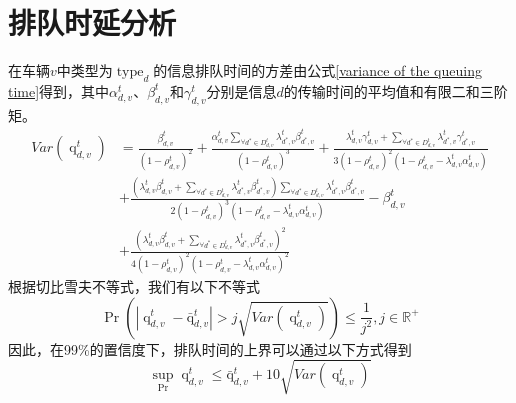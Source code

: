 \section{排队时延分析}\label{appendix e}

在车辆$v$中类型为$\operatorname{type}_d$的信息排队时间的方差由公式\ref{variance of the queuing time}得到，其中$\alpha_{d, v}^t$、$\beta_{d, v}^t$和$\gamma_{d, v}^t$分别是信息$d$的传输时间的平均值和有限二和三阶矩。
\begin{equation}	    
 		\begin{aligned}
	{Var}(\operatorname{q}_{d, v}^t) &= \frac{\beta_{d, v}^t}{(1- \rho_{d, v}^{t})^2} + \frac{\alpha_{d, v}^t \sum\limits_{\forall d^* \in D_{d, v}^t} \lambda_{d^*, v}^t \beta_{d^*, v}^t}{(1- \rho_{d, v}^{t})^3} + \frac{\lambda_{d, v}^{t} \gamma_{d, v}^t + \sum\limits_{\forall d^* \in D_{d, v}^t} \lambda_{d^*, v}^t \gamma_{d^*, v}^t}{3(1- \rho_{d, v}^{t})^2(1-\rho_{d, v}^{t} - \lambda_{d, v}^{t}  \alpha_{d, v}^t)} \\ 
	& + \frac{(\lambda_{d, v}^{t} \beta_{d, v}^t + \sum\limits_{\forall d^* \in D_{d, v}^t} \lambda_{d^*, v}^t \beta_{d^*, v}^t) \sum\limits_{\forall d^* \in D_{d, v}^t} \lambda_{d^*, v}^t \beta_{d^*, v}^t }{2(1- \rho_{d, v}^{t})^3(1-\rho_{d, v}^{t} - \lambda_{d, v}^{t}  \alpha_{d, v}^t)} - \beta_{d, v}^t \\
	& + \frac{(\lambda_{d, v}^{t} \beta_{d, v}^t + \sum\limits_{\forall d^* \in D_{d, v}^t} \lambda_{d^*, v}^t \beta_{d^*, v}^t)^2}{4(1- \rho_{d, v}^{t})^2(1-\rho_{d, v}^{t} - \lambda_{d, v}^{t}  \alpha_{d, v}^t)^2}
\end{aligned}
\label{variance of the queuing time}
 	\end{equation}
根据切比雪夫不等式，我们有以下不等式
\begin{equation}
	\operatorname{Pr}(|\operatorname{q}_{d, v}^t - \operatorname{\bar{q}}_{d, v}^t| > j \sqrt{{Var}(\operatorname{q}_{d, v}^t)}) \leq \frac{1}{j^2}, j \in \mathbb{R}^{+}
\end{equation}
因此，在99\%的置信度下，排队时间的上界可以通过以下方式得到
\begin{equation}
	\sup_{\operatorname{Pr}}{\operatorname{q}_{d, v}^t} \leq \operatorname{\bar{q}}_{d, v}^t + 10  \sqrt{{Var}(\operatorname{q}_{d, v}^t)}
\end{equation}

